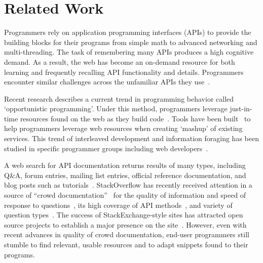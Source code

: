\section{Related Work}

Programmers rely on application programming interfaces (APIs) to provide the building blocks for their programs from simple math to advanced networking and multi-threading.
The task of remembering many APIs produces a high cognitive demand.
As a result, the web has become an on-demand resource for both learning and frequently recalling API functionality and details.
Programmers encounter similar challenges across the unfamiliar APIs they use~\cite{Duala-Ekoko-Asking}.

Recent research describes a current trend in programming behavior called `opportunistic programming'.
Under this method, programmers leverage just-in-time resources found on the web as they build code~\cite{Brandt-Opportunistic}.
Tools have been built~\cite{Hartmann-Dmix} to help programmers leverage web resources when creating `mashup' of existing services.
This trend of interleaved development and information foraging has been studied in specific programmer groups including web developers~\cite{Dorn-Interleaved}.

A web search for API documentation returns results of many types, including Q\&A, forum entries, mailing list entries, official reference documentation, and blog posts such as tutorials~\cite{Parnin-Measuring}.
StackOverflow has recently received attention in a source of ``crowd documentation''~\cite{Parnin-Crowd} for the quality of information and speed of response to questions~\cite{Mamykina-Fastest}, its high coverage of API methods~\cite{Parnin-Crowd}, and variety of question types~\cite{Nasehi-What}.
The success of StackExchange-style sites has attracted open source projects to establish a major presence on the site~\cite{Vasilescu-How}.
However, even with recent advances in quality of crowd documentation, end-user programmers still stumble to find relevant, usable resources and to adapt snippets found to their programs.

